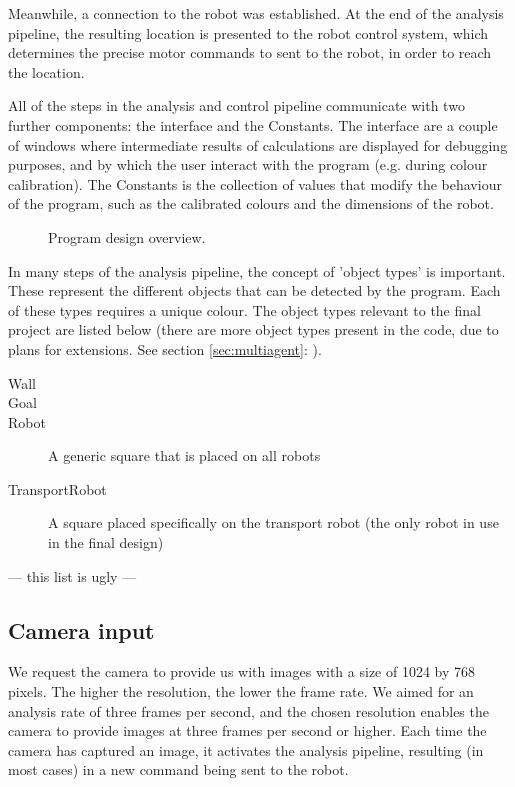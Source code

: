 \documentclass[10pt, abstracton]{scrartcl}
\newcommand{\sref}[1]{section \vref{#1}: \nameref{#1}}
\begin{document}
Meanwhile, a connection to the robot was established. At the end of the analysis pipeline, the resulting location is presented to the robot control system, which determines the precise motor commands to sent to the robot, in order to reach the location.

All of the steps in the analysis and control pipeline communicate with two further components: the interface and the Constants. The interface are a couple of windows where intermediate results of calculations are displayed for debugging purposes, and by which the user interact with the program (e.g. during colour calibration). The Constants is the collection of values that modify the behaviour of the program, such as the calibrated colours and the dimensions of the robot.

\begin{figure}
	\begin{center}
	
	\end{center}
	\caption{\small Program design overview.}
	\label{fig:programOverview}
\end{figure}

In many steps of the analysis pipeline, the concept of 'object types' is important. These represent the different objects that can be detected by the program. Each of these types requires a unique colour. The object types relevant to the final project are listed below (there are more object types present in the code, due to plans for extensions. See \sref{sec:multiagent}).

\begin{description}
  \item[Wall]
  \item[Goal]
  \item[Robot] A generic square that is placed on all robots
  \item[TransportRobot] A square placed specifically on the transport robot (the only robot in use in the final design)
\end{description}

--- this list is ugly ---

\subsection{Camera input}
We request the camera to provide us with images with a size of 1024 by 768 pixels. The higher the resolution, the lower the frame rate. We aimed for an analysis rate of three frames per second, and the chosen resolution enables the camera to provide images at three frames per second or higher. Each time the camera has captured an image, it activates the analysis pipeline, resulting (in most cases) in a new command being sent to the robot.
\end{document}
